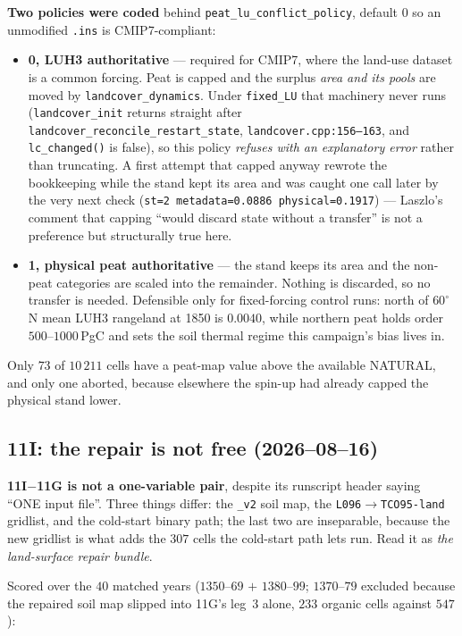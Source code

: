 \documentclass[10pt]{article}
\begin{document}
\textbf{Two policies were coded} behind \texttt{peat\_lu\_conflict\_policy}, default $0$ so
an unmodified \texttt{.ins} is CMIP7-compliant:
\begin{itemize}\itemsep2pt
\item \textbf{0, LUH3 authoritative} --- required for CMIP7, where the land-use dataset is
a common forcing. Peat is capped and the surplus \emph{area and its pools} are moved by
\texttt{landcover\_dynamics}. Under \texttt{fixed\_LU} that machinery never runs
(\texttt{landcover\_init} returns straight after
\texttt{landcover\_reconcile\_restart\_state}, \texttt{landcover.cpp:156--163}, and
\texttt{lc\_changed()} is false), so this policy \emph{refuses with an explanatory error}
rather than truncating. A first attempt that capped anyway rewrote the bookkeeping while
the stand kept its area and was caught one call later by the very next check
(\texttt{st=2 metadata=0.0886 physical=0.1917}) --- Laszlo's comment that capping
``would discard state without a transfer'' is not a preference but structurally true here.
\item \textbf{1, physical peat authoritative} --- the stand keeps its area and the non-peat
categories are scaled into the remainder. Nothing is discarded, so no transfer is needed.
Defensible only for fixed-forcing control runs: north of $60^\circ$N mean LUH3 rangeland at
1850 is $0.0040$, while northern peat holds order $500$--$1000$\,PgC and sets the soil
thermal regime this campaign's bias lives in.
\end{itemize}
Only $73$ of $10\,211$ cells have a peat-map value above the available NATURAL, and only
one aborted, because elsewhere the spin-up had already capped the physical stand lower.

\subsection{11I: the repair is not free (2026--08--16)}\label{sub:r29repair}
\textbf{11I${-}$11G is not a one-variable pair}, despite its runscript header saying ``ONE
input file''. Three things differ: the \texttt{\_v2} soil map, the
\texttt{L096}$\to$\texttt{TCO95-land} gridlist, and the cold-start binary path; the last
two are inseparable, because the new gridlist is what adds the $307$ cells the cold-start
path lets run. Read it as \emph{the land-surface repair bundle}.

Scored over the $40$ matched years ($1350$--$69$ ${+}$ $1380$--$99$; $1370$--$79$ excluded
because the repaired soil map slipped into 11G's leg~3 alone, $233$ organic cells against
$547$):
\end{document}
